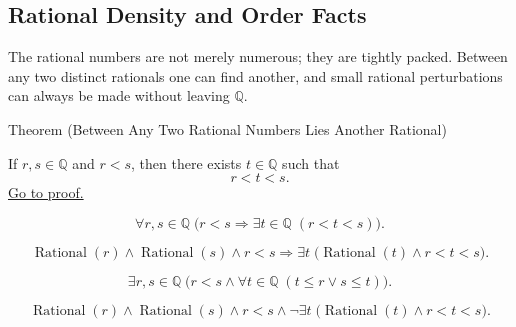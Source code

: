 
\subsection*{Rational Density and Order Facts}
\label{sec:rational-density-and-order}

\begin{exposition}
The rational numbers are not merely numerous; they are tightly packed. Between
any two distinct rationals one can find another, and small rational
perturbations can always be made without leaving $\mathbb{Q}$.
\end{exposition}

\begin{theorembox}{Theorem (Between Any Two Rational Numbers Lies Another Rational)}
\begin{theorem}
\label{thm:between-any-two-rationals-is-a-rational}
If $r,s\in\mathbb{Q}$ and $r<s$, then there exists $t\in\mathbb{Q}$ such that
\[
r<t<s.
\]
\hyperref[prf:between-any-two-rationals-is-a-rational]{Go to proof.}
\end{theorem}
\end{theorembox}

\begin{remark*}
\[
\forall r,s\in\mathbb{Q}\;
\bigl(r<s \Longrightarrow \exists t\in\mathbb{Q}\;(r<t<s)\bigr).
\]
\end{remark*}

\begin{remark*}
\[
\operatorname{Rational}(r)\land \operatorname{Rational}(s)\land r<s
\Longrightarrow
\exists t\;\bigl(\operatorname{Rational}(t)\land r<t<s\bigr).
\]
\end{remark*}

\begin{remark*}
\[
\exists r,s\in\mathbb{Q}\;
\bigl(r<s \land \forall t\in\mathbb{Q}\;(t\le r \lor s\le t)\bigr).
\]
\end{remark*}

\begin{remark*}
\[
\operatorname{Rational}(r)\land \operatorname{Rational}(s)\land r<s
\land
\neg\exists t\;\bigl(\operatorname{Rational}(t)\land r<t<s\bigr).
\]
\end{remark*}

